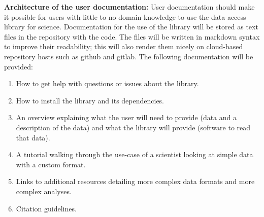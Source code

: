 \begin{comment}
\begin{lstlisting}
def [*size(self)*]:
    # Python has no internal File object API function to get
    # current file / StringIO size, thus we use the following
    # trick.
    io = self._io
    # Remember our current position
    [*cur_pos = *]io.tell()
    # Seek to the end of the File object
    io.seek(0, SEEK_END)
    # Remember position, which is equal to the full length
    [*full_size = *]io.tell()
    # Seek back to the current position
    [*io.seek(cur_pos)*]
[*return full_size*]
\end{lstlisting}

\begin{lstlisting}
uint64_t kaitai::kstream::[*size()*] {
    std::iostream::pos_type [*cur_pos = *]m_io->tellg();
    m_io->seekg(0, std::ios::end);
    std::iostream::pos_type [*len = *]m_io->tellg();
    [*m_io->seekg(cur_pos)*];
    [*return len*];
}
\caption{The details of this code are not important.  What is significant is the name of this function, size(), and its behavior: find and report the size of the file, without changing where we are in the file.  The Katai Struct compiler for both C++ and python can use the ``size()'' function rather than including these language-specific stream commands, making the compiler code more readable.}
\end{lstlisting}
\end{comment}

\textbf{Architecture of the user documentation:} User documentation should make it possible for users with little to no domain knowledge to use the data-access library for science.  Documentation for the use of the library will be stored as text files in the repository with the code.  The files will be written in markdown syntax to improve their readability; this will also render them nicely on cloud-based repository hosts such as github and gitlab.  The following documentation will be provided:

\begin{enumerate}
    \item How to get help with questions or issues about the library.
    \item How to install the library and its dependencies.
    \item An overview explaining what the user will need to provide (data and a description of the data) and what the library will provide (software to read that data).
    \item A tutorial walking through the use-case of a scientist looking at simple data with a custom format.
    \item Links to additional resources detailing more complex data formats and more complex analyses.
    \item Citation guidelines.  
\end{enumerate}


